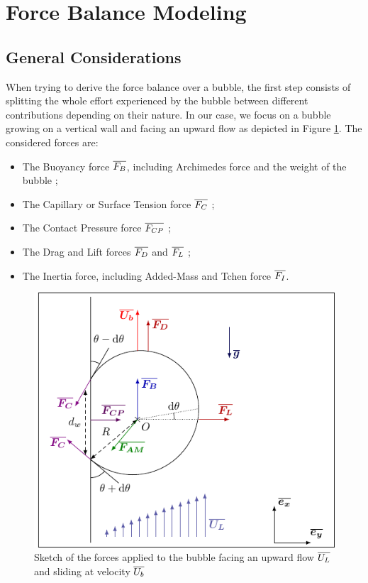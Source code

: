\section{Force Balance Modeling}\label{sec:forces}

\subsection{General Considerations}\label{subsec:general}

When trying to derive the force balance over a bubble, the first step consists of splitting the whole effort experienced by the bubble between different contributions depending on their nature. In our case, we focus on a bubble growing on a vertical wall and facing an upward flow as depicted in Figure \ref{fig:bub_forces}. The considered forces are:



\begin{itemize}
\item The Buoyancy force $\overline{F_{B}}$, including Archimedes force and the weight of the bubble ;
\item The Capillary or Surface Tension force $\overline{F_{C}}$ ;
\item The Contact Pressure force $\overline{F_{CP}}$ ;
\item The Drag and Lift forces $\overline{F_{D}}$ and $\overline{F_{L}}$ ;
\item The Inertia force, including Added-Mass and Tchen force $\overline{F_{I}}$.
\end{itemize}





\begin{figure}[h!]
\centering
%
\includegraphics[width=0.6\linewidth]{img/forces/bub_bdf.pdf}
\caption{Sketch of the forces applied to the bubble facing an upward flow $\overline{U_{L}}$ and sliding at velocity $\overline{U_{b}}$}
\label{fig:bub_forces}
\end{figure}




